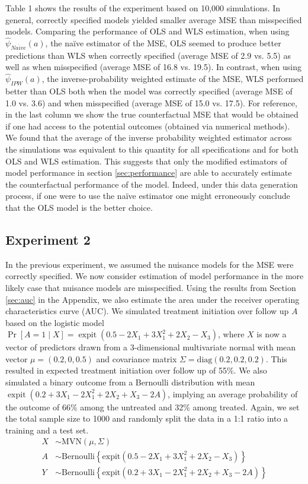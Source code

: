 Table 1 shows the results of the experiment based on 10,000 simulations. In general, correctly specified models yielded smaller average MSE than misspecified models. Comparing the performance of OLS and WLS estimation, when using $\widehat{\psi}_{Na\ddot{i}ve}(a)$, the na\"{i}ve estimator of the MSE, OLS seemed to produce better predictions than WLS when correctly specified (average MSE of 2.9 vs. 5.5) as well as when misspecified (average MSE of 16.8 vs. 19.5). In contrast, when using $\widehat{\psi}_{IPW}(a)$, the inverse-probability weighted estimate of the MSE, WLS performed better than OLS both when the model was correctly specified (average MSE of 1.0 vs. 3.6) and when misspecified (average MSE of 15.0 vs. 17.5). For reference, in the last column we show the true counterfactual MSE that would be obtained if one had access to the potential outcomes (obtained via numerical methods). We found that the average of the inverse probability weighted estimator across the simulations was equivalent to this quantity for all specifications and for both OLS and WLS estimation. This suggests that only the modified estimators of model performance in section \ref{sec:performance} are able to accurately estimate the counterfactual performance of the model. Indeed, under this data generation process, if one were to use the na\"{i}ve estimator one might erroneously conclude that the OLS model is the better choice.


\subsection{Experiment 2}

In the previous experiment, we assumed the nuisance models for the MSE were correctly specified. We now consider estimation of model performance in the more likely case that nuisance models are misspecified. Using the results from Section \ref{sec:auc} in the Appendix, we also estimate the area under the receiver operating characteristics curve (AUC). We simulated treatment initiation over follow up $A$ based on the logistic model $\operatorname{Pr}[A=1 \mid X]=\operatorname{expit}(0.5 - 2 X_1 + 3 X_1^2 + 2 X_2 - X_3)$, where $X$ is now a vector of predictors drawn from a 3-dimensional multivariate normal with mean vector $\mu = (0.2, 0, 0.5)$ and covariance matrix $\Sigma = \text{diag}(0.2, 0.2, 0.2)$. This resulted in expected treatment initiation over follow up of 55\%. We also simulated a binary outcome from a Bernoulli distribution with mean $\operatorname{expit}(0.2 + 3 X_1 - 2 X_1^2 + 2 X_2 + X_3 - 2 A)$, implying an average probability of the outcome of 66\% among the untreated and 32\% among treated. Again, we set the total sample size to 1000 and randomly split the data in a 1:1 ratio into a training and a test set. 
\begin{align*}
    X & \sim \text{MVN}(\mu, \Sigma) \\
    A & \sim \text{Bernoulli}\left\{\text{expit}\left(0.5 - 2 X_1 + 3 X_1^2 + 2 X_2 - X_3\right)\right\} \\
    Y & \sim \text{Bernoulli}\left\{\text{expit}\left(0.2 + 3 X_1 - 2 X_1^2 + 2 X_2 + X_3 - 2 A\right)\right\}
\end{align*}

